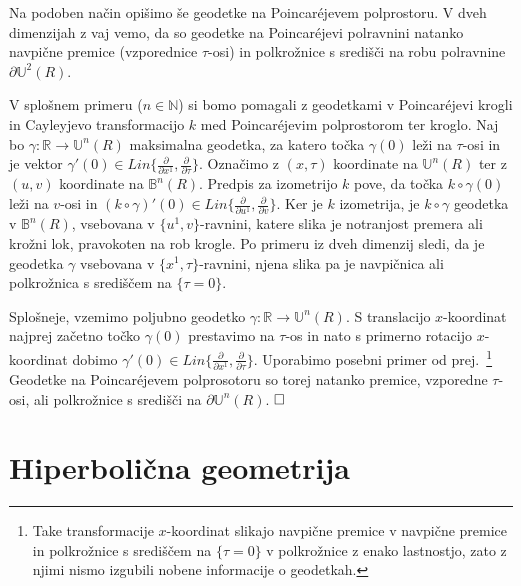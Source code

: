 \documentclass[a4paper]{article}
\def\qed{$\hfill\Box$}   %
\begin{document}
Na podoben način opišimo še geodetke na Poincar\'ejevem polprostoru.
V dveh dimenzijah z vaj vemo, da so geodetke na Poincar\'ejevi polravnini natanko navpične premice (vzporednice $\tau$-osi) in polkrožnice s središči na robu polravnine $\partial \mathbb{U}^{2}(R)$.

V splošnem primeru ($n \in \mathbb{N}$) si bomo pomagali z geodetkami v Poincar\'ejevi krogli in Cayleyjevo transformacijo $k$ med Poincar\'ejevim polprostorom ter kroglo.
%
Naj bo $\gamma \colon \mathbb{R} \to \mathbb{U}^{n}(R)$ maksimalna geodetka, za katero točka $\gamma(0)$ leži na $\tau$-osi in je vektor $\gamma'(0) \in \mathit{Lin} \{ \frac{\partial}{\partial x^{1}}, \frac{\partial}{\partial \tau} \}$.
Označimo z $(x,\tau)$ koordinate na $\mathbb{U}^{n}(R)$ ter z $(u,v)$ koordinate na $\mathbb{B}^{n}(R)$. Predpis za izometrijo $k$ pove, da točka $k \circ \gamma (0)$ leži na $v$-osi in $(k \circ \gamma)'(0) \in \mathit{Lin} \{ \frac{\partial}{\partial u^{1}}, \frac{\partial}{\partial v} \}$.
Ker je $k$ izometrija, je $k \circ \gamma$ geodetka v $\mathbb{B}^{n}(R)$, vsebovana v $\{u^{1},v \}$-ravnini, katere slika je notranjost premera ali krožni lok, pravokoten na rob krogle. Po primeru iz dveh dimenzij sledi, da je geodetka $\gamma$ vsebovana v $\{ x^{1}, \tau \}$-ravnini, njena slika pa je navpičnica ali polkrožnica s središčem na $\{ \tau = 0 \}$.

Splošneje, vzemimo poljubno geodetko $\gamma \colon \mathbb{R} \to \mathbb{U}^{n}(R)$. S translacijo $x$-koordinat najprej začetno točko $\gamma (0)$ prestavimo na $\tau$-os in nato s primerno rotacijo $x$-koordinat dobimo $\gamma'(0) \in \textit{Lin} \{ \frac{\partial}{\partial x^{1}}, \frac{\partial}{\partial \tau} \}$.
Uporabimo posebni primer od prej.~\footnote{Take transformacije $x$-koordinat slikajo navpične premice v navpične premice in polkrožnice s središčem na $\{ \tau =0 \}$ v polkrožnice z enako lastnostjo, zato z njimi nismo izgubili nobene informacije o geodetkah.}
Geodetke na Poincar\'ejevem polprosotoru so torej natanko premice, vzporedne $\tau$-osi, ali polkrožnice s središči na $\partial \mathbb{U}^{n}(R)$.
\qed

\section{Hiperbolična geometrija}


\begin{thebibliography}{99}

\end{thebibliography}
\end{document}
